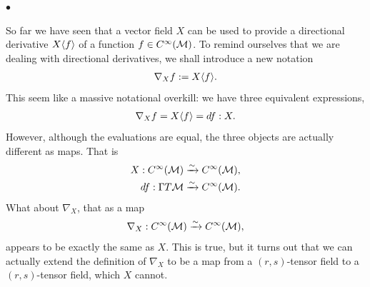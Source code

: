\documentclass[12pt]{article} %
\begin{document}
$\bullet$ 

So far we have seen that a vector field $X$ can be used to provide a directional derivative $X\langle f\rangle$ of a function $f\in C^{\infty}(\mathcal{M})$. To remind ourselves that we are dealing with directional derivatives, we shall introduce a new notation 
\begin{align*} 
    \nabla_X f := X\langle f\rangle.
\end{align*} 
This seem like a massive notational overkill: we have three equivalent expressions,
\begin{align*}
    \nabla_X f = X\langle f\rangle = df:X.
\end{align*} 
However, although the evaluations are equal, the three objects are actually different as maps. That is
\begin{equation*}
    \begin{split}
        X : C^{\infty}(\mathcal{M}) & \xrightarrow{\sim} C^{\infty}(\mathcal{M}), \\
        df : \Gamma T\mathcal{M} & \xrightarrow{\sim} C^{\infty}(\mathcal{M}).
    \end{split}
\end{equation*}
What about $\nabla_X$, that as a map
\begin{align*} 
    \nabla_X : C^{\infty}(\mathcal{M}) \xrightarrow{\sim} C^{\infty}(\mathcal{M}),
\end{align*} 
appears to be exactly the same as $X$. This is true, but it turns out that we can actually extend the definition of $\nabla_X$ to be a map from a $(r,s)$-tensor field to a $(r,s)$-tensor field, which $X$ cannot. 
\end{document}
